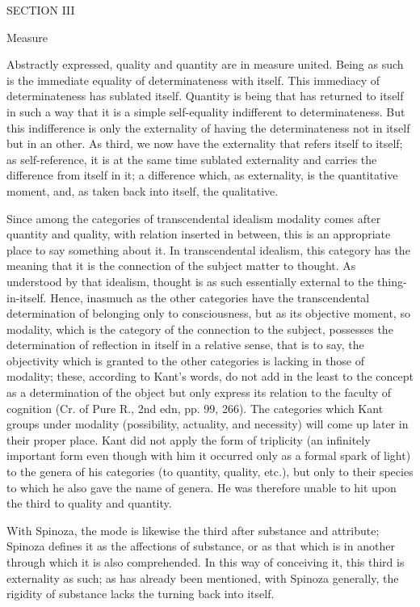 SECTION III

Measure

Abstractly expressed, quality and quantity are in measure united.
Being as such is the immediate equality of determinateness with itself.
This immediacy of determinateness has sublated itself.
Quantity is being that has returned to itself in such a way
that it is a simple self-equality indifferent to determinateness.
But this indifference is only the externality of having
the determinateness not in itself but in an other.
As third, we now have the externality that refers itself to itself;
as self-reference, it is at the same time sublated externality and
carries the difference from itself in it;
a difference which, as externality, is the quantitative moment,
and, as taken back into itself, the qualitative.

Since among the categories of transcendental idealism
modality comes after quantity and quality,
with relation inserted in between,
this is an appropriate place to say something about it.
In transcendental idealism, this category has the meaning that
it is the connection of the subject matter to thought.
As understood by that idealism, thought is as such
essentially external to the thing-in-itself.
Hence, inasmuch as the other categories have
the transcendental determination of
belonging only to consciousness,
but as its objective moment,
so modality, which is the category of
the connection to the subject,
possesses the determination of
reflection in itself in a relative sense,
that is to say, the objectivity
which is granted to the other categories
is lacking in those of modality;
these, according to Kant's words,
do not add in the least to the concept
as a determination of the object
but only express its relation to the faculty of cognition
(Cr. of Pure R., 2nd edn, pp. 99, 266).
The categories which Kant groups under modality
(possibility, actuality, and necessity)
will come up later in their proper place.
Kant did not apply the form of triplicity
(an infinitely important form even though with him
it occurred only as a formal spark of light)
to the genera of his categories (to quantity, quality, etc.),
but only to their species to which
he also gave the name of genera.
He was therefore unable to hit upon
the third to quality and quantity.

With Spinoza, the mode is likewise
the third after substance and attribute;
Spinoza defines it as the affections of substance,
or as that which is in another through which it is also comprehended.
In this way of conceiving it, this third is externality as such;
as has already been mentioned, with Spinoza generally,
the rigidity of substance lacks the turning back into itself.

